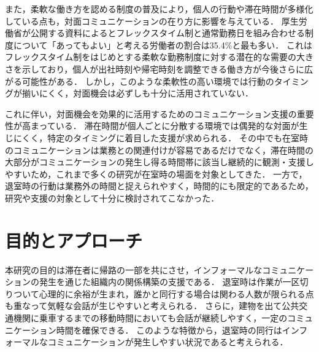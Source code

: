 %
また，柔軟な働き方を認める制度の普及により，個人の行動や滞在時間が多様化している点も，対面コミュニケーションの在り方に影響を与えている．
厚生労働省が公開する資料\cite{fle}によるとフレックスタイム制と通常勤務日を組み合わせる制度について「あってもよい」と考える労働者の割合は35.4\%と最も多い．
これはフレックスタイム制をはじめとする柔軟な勤務制度に対する潜在的な需要の大きさを示しており，個人が出社時刻や帰宅時刻を調整できる働き方が今後さらに広がる可能性がある．
しかし，このような柔軟性の高い環境では行動のタイミングが揃いにくく，対面機会は必ずしも十分に活用されていない．

%
これに伴い，対面機会を効果的に活用するためのコミュニケーション支援の重要性が高まっている．
滞在時間が個人ごとに分散する環境では偶発的な対面が生じにくく，特定のタイミングに着目した支援が求められる．
その中でも在室時のコミュニケーションは業務との関連付けが容易であるだけでなく，滞在時間の大部分がコミュニケーションの発生し得る時間帯に該当し継続的に観測・支援しやすいため，これまで多くの研究が在室時の場面を対象としてきた．
一方で，退室時の行動は業務外の時間と捉えられやすく，時間的にも限定的であるため，研究や支援の対象として十分に検討されてこなかった．



\section{目的とアプローチ}
\label{sec:abstract}

本研究の目的は滞在者に帰路の一部を共にさせ，インフォーマルなコミュニケーションの発生を通じた組織内の関係構築の支援である．
退室時は作業が一区切りついて心理的に余裕が生まれ，誰かと同行する場合は関わる人数が限られる点も重なって気軽な会話が生じやすいと考えられる．
さらに，建物を出て公共交通機関に乗車するまでの移動時間においても会話が継続しやすく，一定のコミュニケーション時間を確保できる．
このような特徴から，退室時の同行はインフォーマルなコミュニケーションが発生しやすい状況であると考えられる．

